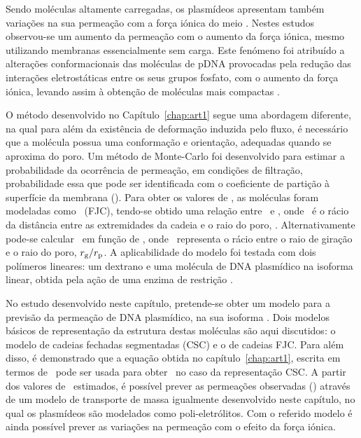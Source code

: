 Sendo moléculas altamente carregadas, os plasmídeos apresentam também variações na sua permeação com a força iónica do meio \cite{latusalt,ager}.
%
Nestes estudos observou-se um aumento da permeação com o aumento da força iónica, mesmo utilizando membranas essencialmente sem carga. Este fenómeno foi atribuído a alterações conformacionais das moléculas de \mbox{pDNA} provocadas pela redução das interações eletrostáticas entre os seus grupos fosfato, com o aumento da força iónica, levando assim à obtenção de moléculas mais compactas \cite{latusalt}.
%
%

O método desenvolvido no Capítulo~\ref{chap:art1} segue uma abordagem diferente, na qual para além da existência de deformação induzida pelo fluxo, é necessário que a molécula possua uma conformação e orientação, adequadas quando se aproxima do poro. Um método de Monte-Carlo foi desenvolvido para estimar a probabilidade da ocorrência de permeação, em condições de filtração, probabilidade essa que pode ser identificada com o coeficiente de partição à superfície da membrana (\particao).
%
%
Para obter os valores de \particao, as moléculas foram modeladas como \fjc\ (FJC), tendo-se obtido uma relação entre \particao\ e \lambdah, onde \lambdah\ é o rácio da distância entre as extremidades da cadeia e o raio do poro, \lambdahfor. Alternativamente pode-se calcular \particao\ em função de \lambdag, onde \lambdag\ representa o rácio entre o raio de giração e o raio do poro, $r_{\mathrm{g}}/r_{\mathrm{p}}$. A aplicabilidade do modelo foi testada com dois polímeros lineares: um dextrano e uma molécula de DNA plasmídico na isoforma linear, obtida pela ação de uma enzima de restrição \cite{meu1}.
%

No estudo desenvolvido neste capítulo, pretende-se obter um modelo para a previsão da permeação de DNA plasmídico, na sua isoforma \superenrolada.
%
Dois modelos básicos de representação da estrutura destas moléculas são aqui discutidos: o modelo de cadeias fechadas segmentadas (CSC) e o de cadeias FJC. Para além disso, é demonstrado que a equação obtida no capítulo~\ref{chap:art1}, escrita em termos de \lambdag\, pode ser usada para obter \particao\ no caso da representação CSC. A partir dos valores de \particao\ estimados, é possível prever as permeações observadas (\permobs) através de um modelo de transporte de massa igualmente desenvolvido neste capítulo, no qual os plasmídeos são modelados como poli-eletrólitos.
%
Com o referido modelo é ainda possível prever as variações na permeação com o efeito da força iónica.

